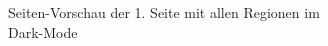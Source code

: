 \documentclass[notables, nomenclature, oneside, 150]{HSMW-Thesis}
\begin{document}
\begin{figure}[h]
\begin{subfigure}[t]{0.3\textwidth}
        	\caption{Seiten-Vorschau der 1. Seite mit allen Regionen im Dark-Mode}
        	\label{fig:l5}
    	\end{subfigure}
		\begin{subfigure}[t]{0.3\textwidth}

\end{subfigure}
\end{figure}
\end{document}
